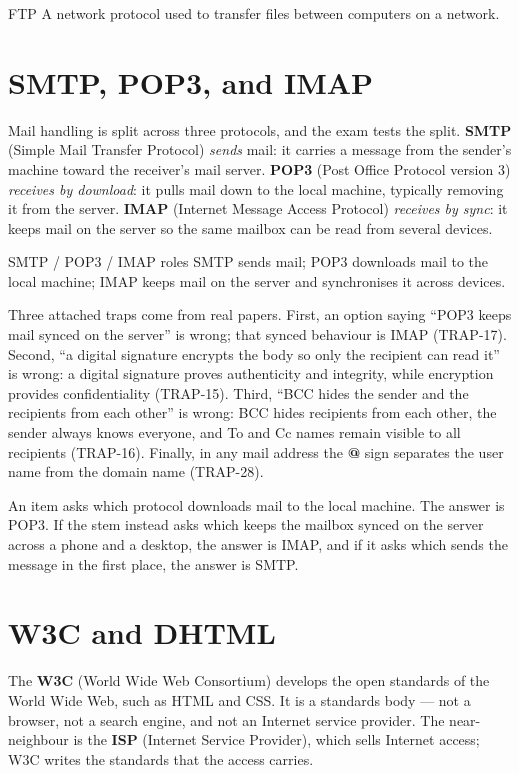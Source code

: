 \begin{definitionbox}{FTP}
A network protocol used to transfer files between computers on a network.
\end{definitionbox}

\section{SMTP, POP3, and IMAP}
Mail handling is split across three protocols, and the exam tests the split.
\textbf{SMTP} (Simple Mail Transfer Protocol) \emph{sends} mail: it carries a
message from the sender's machine toward the receiver's mail server.
\textbf{POP3} (Post Office Protocol version 3) \emph{receives by download}:
it pulls mail down to the local machine, typically removing it from the
server. \textbf{IMAP} (Internet Message Access Protocol) \emph{receives by
sync}: it keeps mail on the server so the same mailbox can be read from
several devices.

\begin{definitionbox}{SMTP / POP3 / IMAP roles}
SMTP sends mail; POP3 downloads mail to the local machine; IMAP keeps mail on
the server and synchronises it across devices.
\end{definitionbox}

Three attached traps come from real papers. First, an option saying
``POP3 keeps mail synced on the server'' is wrong; that synced behaviour is
IMAP (TRAP-17). Second, ``a digital signature encrypts the body so only the
recipient can read it'' is wrong: a digital signature proves authenticity and
integrity, while encryption provides confidentiality (TRAP-15). Third,
``BCC hides the sender and the recipients from each other'' is wrong: BCC
hides recipients from each other, the sender always knows everyone, and To
and Cc names remain visible to all recipients (TRAP-16). Finally, in any mail
address the \textbf{@} sign separates the user name from the domain name
(TRAP-28).

\begin{example}
An item asks which protocol downloads mail to the local machine. The answer
is POP3. If the stem instead asks which keeps the mailbox synced on the
server across a phone and a desktop, the answer is IMAP, and if it asks
which sends the message in the first place, the answer is SMTP.
\end{example}

\section{W3C and DHTML}
The \textbf{W3C} (World Wide Web Consortium) develops the open standards of
the World Wide Web, such as HTML and CSS. It is a standards body --- not a
browser, not a search engine, and not an Internet service provider. The
near-neighbour is the \textbf{ISP} (Internet Service Provider), which sells
Internet access; W3C writes the standards that the access carries.

